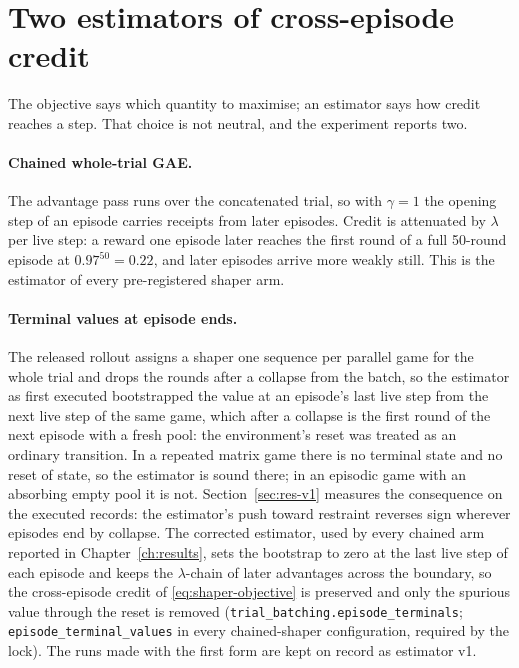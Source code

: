 \section{Two estimators of cross-episode credit}
\label{sec:method-estimators}

The objective says which quantity to maximise; an estimator says how credit
reaches a step. That choice is not neutral, and the experiment reports two.

\paragraph{Chained whole-trial GAE.}
The advantage pass runs over the concatenated trial, so with \(\gamma=1\)
the opening step of an episode carries receipts from later episodes.
Credit is attenuated by \(\lambda\) per live step: a reward one episode
later reaches the first round of a full 50-round episode at
\(0.97^{50}=0.22\), and later episodes arrive more weakly still.
This is the estimator of every pre-registered shaper arm.

\paragraph{Terminal values at episode ends.}
The released rollout assigns a shaper one sequence per parallel game for
the whole trial and drops the rounds after a collapse from the batch, so
the estimator as first executed bootstrapped the value at an episode's
last live step from the next live step of the same game, which after a
collapse is the first round of the next episode with a fresh pool: the
environment's reset was treated as an ordinary transition.
In a repeated matrix game there is no terminal state and no reset of
state, so the estimator is sound there; in an episodic game with an
absorbing empty pool it is not.
Section~\ref{sec:res-v1} measures the consequence on the executed
records: the estimator's push toward restraint reverses sign wherever
episodes end by collapse.
The corrected estimator, used by every chained arm reported in
Chapter~\ref{ch:results}, sets the bootstrap to zero at the last live
step of each episode and keeps the \(\lambda\)-chain of later advantages
across the boundary, so the cross-episode credit of
\eqref{eq:shaper-objective} is preserved and only the spurious value
through the reset is removed
(\texttt{trial\_batching.episode\_terminals};
\texttt{episode\_terminal\_values} in every chained-shaper configuration,
required by the lock).
The runs made with the first form are kept on record as estimator v1.

